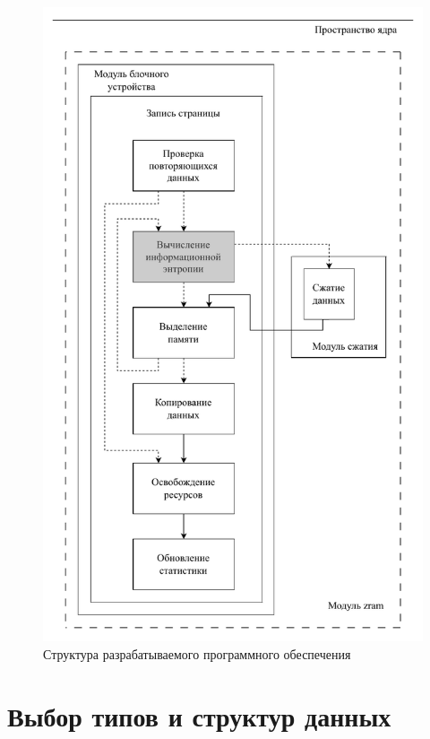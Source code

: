\begin{figure}[H]
	\begin{center}
		\includegraphics[scale=0.6]{inc/img/structure.pdf}
	\end{center}
	\captionsetup{justification=centering}
	\caption{Структура разрабатываемого программного обеспечения}
	\label{img:structure}
\end{figure}

\section{Выбор типов и структур данных}


